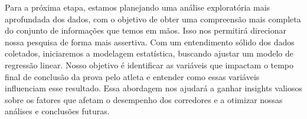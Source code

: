 Para a próxima etapa, estamos planejando uma análise exploratória mais aprofundada dos dados, com o objetivo de obter uma compreensão mais completa do conjunto de informações que temos em mãos. Isso nos permitirá direcionar nossa pesquisa de forma mais assertiva. Com um entendimento sólido dos dados coletados, iniciaremos a modelagem estatística, buscando ajustar um modelo de regressão linear. Nosso objetivo é identificar as variáveis que impactam o tempo final de conclusão da prova pelo atleta e entender como essas variáveis influenciam esse resultado. Essa abordagem nos ajudará a ganhar insights valiosos sobre os fatores que afetam o desempenho dos corredores e a otimizar nossas análises e conclusões futuras.







